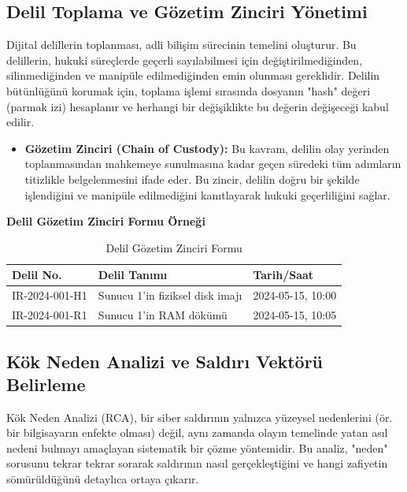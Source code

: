 \begin{itemize}
\begin{itemize}
\subsection{Delil Toplama ve Gözetim Zinciri Yönetimi}

Dijital delillerin toplanması, adli bilişim sürecinin temelini oluşturur. Bu delillerin, hukuki süreçlerde geçerli sayılabilmesi için değiştirilmediğinden, silinmediğinden ve manipüle edilmediğinden emin olunması gereklidir. Delilin bütünlüğünü korumak için, toplama işlemi sırasında dosyanın "hash" değeri (parmak izi) hesaplanır ve herhangi bir değişiklikte bu değerin değişeceği kabul edilir.
\begin{itemize}
    \item \textbf{Gözetim Zinciri (Chain of Custody):} Bu kavram, delilin olay yerinden toplanmasından mahkemeye sunulmasına kadar geçen süredeki tüm adımların titizlikle belgelenmesini ifade eder. Bu zincir, delilin doğru bir şekilde işlendiğini ve manipüle edilmediğini kanıtlayarak hukuki geçerliliğini sağlar.
\end{itemize}

\textbf{Delil Gözetim Zinciri Formu Örneği}

\begin{table}[ht]
\centering
\begin{tabularx}{0.95\textwidth}{|X|X|X|}
\hline
\textbf{Delil No.} & \textbf{Delil Tanımı} & \textbf{Tarih/Saat} \\
\hline
IR-2024-001-H1 & Sunucu 1'in fiziksel disk imajı & 2024-05-15, 10:00 \\
\hline
IR-2024-001-R1 & Sunucu 1'in RAM dökümü & 2024-05-15, 10:05 \\
\hline
\end{tabularx}
\caption{Delil Gözetim Zinciri Formu}
\end{table}

\subsection{Kök Neden Analizi ve Saldırı Vektörü Belirleme}

Kök Neden Analizi (RCA), bir siber saldırının yalnızca yüzeysel nedenlerini (ör. bir bilgisayarın enfekte olması) değil, aynı zamanda olayın temelinde yatan asıl nedeni bulmayı amaçlayan sistematik bir çözme yöntemidir. Bu analiz, "neden" sorusunu tekrar tekrar sorarak saldırının nasıl gerçekleştiğini ve hangi zafiyetin sömürüldüğünü detaylıca ortaya çıkarır.


\end{itemize}
\end{itemize}
